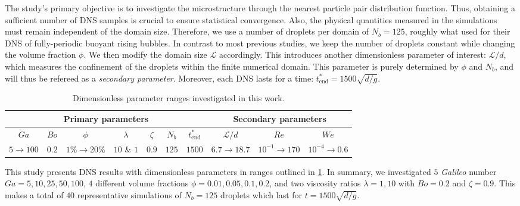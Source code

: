 

The study's primary objective is to investigate the microstructure through the nearest particle pair distribution function.
Thus, obtaining a sufficient number of DNS samples is crucial to ensure statistical convergence. 
Also, the physical quantities measured in the simulations must remain independent of the domain size. 
Therefore, we use a number of droplets per domain of $N_b = 125$, roughly what \citet{hidman2023assessing} used for their DNS of fully-periodic buoyant rising bubbles.
In contrast to most previous studies, we keep the number of droplets constant while changing the volume fraction $\phi$. 
We then modify the domain size $\mathcal{L}$ accordingly. 
This introduces another dimensionless parameter of interest: $\mathcal{L}/d$, which measures the confinement of the droplets within the finite numerical domain. 
This parameter is purely determined by $\phi$ and $N_b$, and will thus be refereed as a \textit{secondary parameter}.
Moreover, each DNS lasts for a time: $t^*_\text{end} = 1500 \sqrt{d/g}$.
\begin{table}[h!]
    \footnotesize
    \centering
    \caption{Dimensionless parameter ranges investigated in this work.}
    \begin{tabular}{|ccccccc|ccc|}\hline
        \multicolumn{7}{|c|}{Primary parameters}&\multicolumn{3}{|c|}{Secondary parameters}\\\hline\hline
        $Ga$&$Bo$&$\phi$&$\lambda$&$\zeta$&$N_b$&$t^*_\text{end}$&$\mathcal{L}/d$&$Re$&$We$\\ \hline
        $5\rightarrow 100$&$0.2$&$1\% \rightarrow 20\%$&$10$ \& $1$&$0.9$&$125$&$1500$&$6.7\to 18.7$&$10^{-1}\to 170$&$10^{-4}\to 0.6$\\ \hline
    \end{tabular}
    \label{tab:simulations}
\end{table}
This study presents DNS results with dimensionless parameters in ranges outlined in \ref{tab:simulations}.
In summary, we investigated $5$ \textit{Galileo} number $Ga = 5,10,25,50,100$, $4$ different volume fractions $\phi = 0.01,0.05,0.1,0.2$, and two viscosity ratios $\lambda =1,10$ with $Bo = 0.2$ and $\zeta = 0.9$. %
This makes a total of $40$ representative simulations of $N_b = 125$ droplets which last for $t= 1500 \sqrt{d/g}$. 



